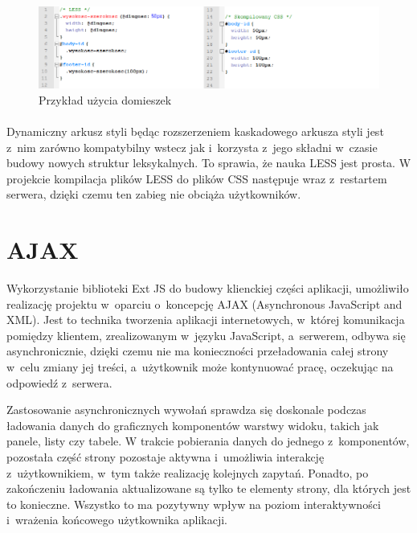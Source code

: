 \begin{figure}[h]
	\centering
	\includegraphics[width=1.00\textwidth]{images/less2.png}
	\caption{Przykład użycia domieszek}
\end{figure}
\paragraph{}

Dynamiczny arkusz styli  będąc rozszerzeniem kaskadowego arkusza styli jest z~nim zarówno kompatybilny wstecz jak i~korzysta z~jego składni w~czasie budowy nowych struktur leksykalnych. To sprawia, że nauka LESS jest prosta.
W projekcie kompilacja plików LESS do plików CSS następuje wraz z~restartem serwera, dzięki czemu ten zabieg nie obciąża użytkowników. \cite{LESS}


\section{AJAX}
Wykorzystanie biblioteki Ext JS do budowy klienckiej części aplikacji, umożliwiło realizację projektu w~oparciu o~koncepcję AJAX (Asynchronous JavaScript and XML). Jest to technika tworzenia aplikacji internetowych, w~której komunikacja pomiędzy klientem, zrealizowanym w~języku JavaScript, a~serwerem, odbywa się asynchronicznie, dzięki czemu nie ma konieczności przeładowania całej strony w~celu zmiany jej treści, a~użytkownik może kontynuować pracę, oczekując na odpowiedź z~serwera.\cite{ajaxWoj}

Zastosowanie asynchronicznych wywołań sprawdza się doskonale podczas ładowania danych do graficznych komponentów warstwy widoku, takich jak panele, listy czy tabele. W trakcie pobierania danych do jednego z~komponentów, pozostała część strony pozostaje aktywna i~umożliwia interakcję z~użytkownikiem, w~tym także realizację kolejnych zapytań. Ponadto, po zakończeniu ładowania aktualizowane są tylko te elementy strony, dla których jest to konieczne. Wszystko to ma pozytywny wpływ na poziom interaktywności i~wrażenia końcowego użytkownika aplikacji.

